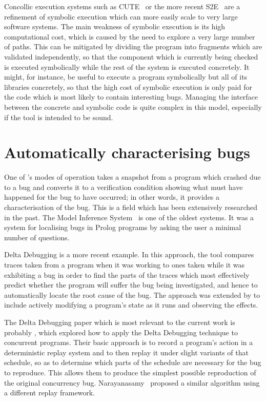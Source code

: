 Concollic execution systems such as CUTE~\cite{Sen2005} or the more
recent S2E~\cite{Chipounov2009} are a refinement of symbolic execution
which can more easily scale to very large software systems.  The main
weakness of symbolic execution is its high computational cost, which
is caused by the need to explore a very large number of paths.  This
can be mitigated by dividing the program into fragments which are
validated independently, so that the component which is currently
being checked is executed symbolically while the rest of the system is
executed concretely.  It might, for instance, be useful to execute a
program symbolically but all of its libraries concretely, so that the
high cost of symbolic execution is only paid for the code which is
most likely to contain interesting bugs.  Managing the interface
between the concrete and symbolic code is quite complex in this model,
especially if the tool is intended to be sound.  

\nocite{Andrews2004}

\section{Automatically characterising bugs}

One of {\implementation}'s modes of operation takes a snapshot from a
program which crashed due to a bug and converts it to a verification
condition showing what must have happened for the bug to have
occurred; in other words, it provides a characterisation of the bug.
This is a field which has been extensively researched in the past.
The Model Inference System~\cite{Shapiro1982} is one of the oldest
systems.  It was a system for localising bugs in Prolog programs by
asking the user a minimal number of questions.

Delta Debugging\cite{Cleve2005} is a more recent example.  In this
approach, the tool compares traces taken from a program when it was
working to ones taken while it was exhibiting a bug in order to find
the parts of the traces which most effectively predict whether the
program will suffer the bug being investigated, and hence to
automatically locate the root cause of the bug.  The approach was
extended by \cite{Jeffrey2009} to include actively
modifying a program's state as it runs and observing the effects.

The Delta Debugging paper which is most relevant to the current work
is probably \cite{Choi2002}, which explored how to apply the Delta
Debugging technique to concurrent programs.  Their basic approach is
to record a program's action in a deterministic replay system and to
then replay it under slight variants of that schedule, so as to
determine which parts of the schedule are necessary for the bug to
reproduce.  This allows them to produce the simplest possible
reproduction of the original concurrency bug.  
Narayanasamy~\cite{Narayanasamy2007} proposed a similar algorithm
using a different replay framework.

